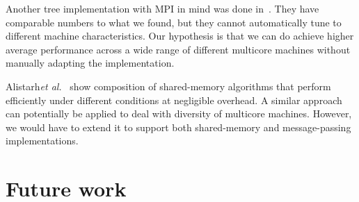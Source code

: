 \documentclass{article}
\newcommand{\etal}{{\it et al.}\xspace}
\begin{document}
Another tree implementation with MPI in mind was done
in~\cite{Graham2008}. They have comparable numbers to what we found,
but they cannot automatically tune to different machine
characteristics. Our hypothesis is that we can do achieve higher
average performance across a wide range of different multicore
machines without manually adapting the implementation.

Alistarh\etal~\cite{Alistarh2012} show composition of shared-memory
algorithms that perform efficiently under different conditions at
negligible overhead. A similar approach can potentially be applied to
deal with diversity of multicore machines. However, we would have
to extend it to support both shared-memory and message-passing
implementations. 

\section{Future work}
\end{document}
